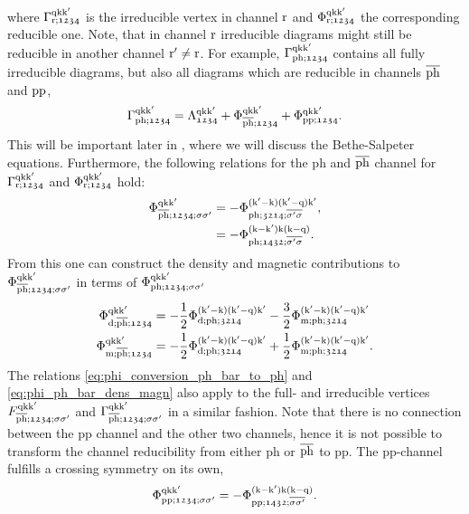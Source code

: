 \documentclass[\main/main.tex]{subfiles}
\begin{document}
where $\Gamma_{\text{r};\mathfrak{1234}}^{\text{q}\text{k}\text{k}'}$ is the irreducible vertex in channel $\text{r}$ and $\Phi_{\text{r};\mathfrak{1234}}^{\text{q}\text{k}\text{k}'}$ the corresponding reducible one. Note, that in channel $\text{r}$ irreducible diagrams might still be reducible in another channel $\text{r}'\neq \text{r}$. For example, $\Gamma_{\text{ph};\mathfrak{1234}}^{\text{q}\text{k}\text{k}'}$ contains all fully irreducible diagrams, but also all diagrams which are reducible in channels $\overline{\text{ph}}$ and $\text{pp}$,
\begin{align}
	\Gamma_{\text{ph};\mathfrak{1234}}^{\text{q}\text{k}\text{k}'}=\Lambda_{\mathfrak{1234}}^{\text{q}\text{k}\text{k}'}+\Phi_{\overline{\text{ph}};\mathfrak{1234}}^{\text{q}\text{k}\text{k}'}+\Phi_{\text{pp};\mathfrak{1234}}^{\text{q}\text{k}\text{k}'}.
\end{align}
This will be important later in , where we will discuss the Bethe-Salpeter equations. Furthermore, the following relations for the ph and $\overline{\text{ph}}$ channel for $\Gamma_{\text{r};\mathfrak{1234}}^{\text{q}\text{k}\text{k}'}$ and $\Phi_{\text{r};\mathfrak{1234}}^{\text{q}\text{k}\text{k}'}$ hold:
\begin{subequations}\label{eq:phi_conversion_ph_bar_to_ph}
\begin{align}
	\Phi_{\overline{\text{ph}};\mathfrak{1234};\sigma\sigma'}^{\text{q}\text{k}\text{k}'}&=-\Phi_{\text{ph};\mathfrak{3214};\overline{\sigma'\sigma}}^{(\text{k}'-\text{k})(\text{k}'-\text{q})\text{k}'},\\
	&=-\Phi_{\text{ph};\mathfrak{1432};\overline{\sigma'\sigma}}^{(\text{k}-\text{k}')\text{k}(\text{k}-\text{q})}.
\end{align}
\end{subequations}
From this one can construct the density and magnetic contributions to $\Phi_{\overline{\text{ph}};\mathfrak{1234};\sigma\sigma'}^{\text{q}\text{k}\text{k}'}$ in terms of $\Phi_{\text{ph};\mathfrak{1234};\sigma\sigma'}^{\text{q}\text{k}\text{k}'}$
\begin{subequations}\label{eq:phi_ph_bar_dens_magn}
\begin{align}
	\Phi_{\text{d};\overline{\text{ph}};\mathfrak{1234}}^{\text{q}\text{k}\text{k}'}&=-\frac12\Phi_{\text{d};\text{ph};\mathfrak{3214}}^{(\text{k}'-\text{k})(\text{k}'-\text{q})\text{k}'}-\frac32\Phi_{\text{m};\text{ph};\mathfrak{3214}}^{(\text{k}'-\text{k})(\text{k}'-\text{q})\text{k}'}\\
	\Phi_{\text{m};\overline{\text{ph}};\mathfrak{1234}}^{\text{q}\text{k}\text{k}'}&=-\frac12\Phi_{\text{d};\text{ph};\mathfrak{3214}}^{(\text{k}'-\text{k})(\text{k}'-\text{q})\text{k}'}+\frac12\Phi_{\text{m};\text{ph};\mathfrak{3214}}^{(\text{k}'-\text{k})(\text{k}'-\text{q})\text{k}'}.
\end{align}
\end{subequations}
The relations \eqref{eq:phi_conversion_ph_bar_to_ph} and \eqref{eq:phi_ph_bar_dens_magn} also apply to the full- and irreducible vertices $F_{\overline{\text{ph}};\mathfrak{1234};\sigma\sigma'}^{\text{q}\text{k}\text{k}'}$ and $\Gamma_{\overline{\text{ph}};\mathfrak{1234};\sigma\sigma'}^{\text{q}\text{k}\text{k}'}$ in a similar fashion. Note that there is no connection between the pp channel and the other two channels, hence it is not possible to transform the channel reducibility from either ph or $\overline{\text{ph}}$ to pp. The pp-channel fulfills a crossing symmetry on its own,
\begin{align}
	\Phi^{\text{q}\text{k}\text{k}'}_{\text{pp};\mathfrak{1234};\sigma\sigma'}=-\Phi^{(\text{k}-\text{k}')\text{k}(\text{k}-\text{q})}_{\text{pp};\mathfrak{1432};\overline{\sigma\sigma'}}.
\end{align}
\end{document}
